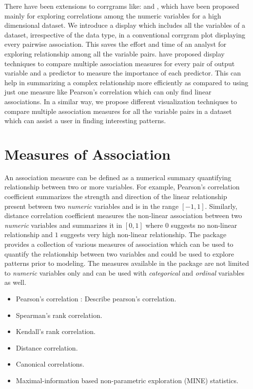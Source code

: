 There have been extensions to corrgrams like:
\citep{buja2016visualization} and \citep{sCorrPlot}, which have been
proposed mainly for exploring correlations among the numeric variables
for a high dimensional dataset. We introduce a display which includes
all the variables of a dataset, irrespective of the data type, in a
conventional corrgram plot displaying every pairwise association. This
saves the effort and time of an analyst for exploring relationship among
all the variable pairs. \citep{kuhn2013applied} have proposed display
techniques to compare multiple association measures for every pair of
output variable and a predictor to measure the importance of each
predictor. This can help in summarizing a complex relationship more
efficiently as compared to using just one measure like Pearson's
correlation which can only find linear associations. In a similar way,
we propose different visualization techniques to compare multiple
association measures for all the variable pairs in a dataset which can
assist a user in finding interesting patterns.

\hypertarget{measures-of-association}{%
\section{Measures of Association}\label{measures-of-association}}

An association measure can be defined as a numerical summary quantifying
relationship between two or more variables. For example, Pearson's
correlation coefficient summarizes the strength and direction of the
linear relationship present between two \emph{numeric} variables and is
in the range \([-1,1]\). Similarly, distance correlation coefficient
measures the non-linear association between two \emph{numeric} variables
and summarizes it in \([0,1]\) where \(0\) suggests no non-linear
relationship and \(1\) suggests very high non-linear relationship. The
package provides a collection of various measures of association which
can be used to quantify the relationship between two variables and could
be used to explore patterns prior to modeling. The measures available in
the package are not limited to \emph{numeric} variables only and can be
used with \emph{categorical} and \emph{ordinal} variables as well.

\begin{itemize}
\item Pearson's correlation : Describe pearson's correlation.
\item Spearman's rank correlation.
\item Kendall's rank correlation.
\item Distance correlation.
\item Canonical correlations.
\item Maximal-information based non-parametric exploration (MINE) statistics.
\end{itemize}


